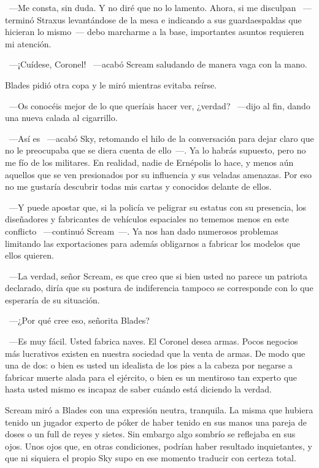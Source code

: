~---Me consta, sin duda. Y no diré que no lo lamento. Ahora, si me disculpan ~---terminó Straxus levantándose de la mesa e indicando a sus guardaespaldas que hicieran lo mismo~--- debo marcharme a la base, importantes asuntos requieren mi atención.

~---¡Cuídese, Coronel! ~---acabó Scream saludando de manera vaga con la mano.

Blades pidió otra copa y le miró mientras evitaba reírse.

~---Os conocéis mejor de lo que queríais hacer ver, ¿verdad? ~---dijo al fin, dando una nueva calada al cigarrillo.

~---Así es ~---acabó Sky, retomando el hilo de la conversación para dejar claro que no le preocupaba que se diera cuenta de ello~---. Ya lo habrás supuesto, pero no me fío de los militares. En realidad, nadie de Ernépolis lo hace, y menos aún aquellos que se ven presionados por su influencia y sus veladas amenazas. Por eso no me gustaría descubrir todas mis cartas y conocidos delante de ellos.

~---Y puede apostar que, si la policía ve peligrar su estatus con su presencia, los diseñadores y fabricantes de vehículos espaciales no tememos menos en este conflicto ~---continuó Scream~---. Ya nos han dado numerosos problemas limitando las exportaciones para además obligarnos a fabricar los modelos que ellos quieren.

~---La verdad, señor Scream, es que creo que si bien usted no parece un patriota declarado, diría que su postura de indiferencia tampoco se corresponde con lo que esperaría de su situación.

~---¿Por qué cree eso, señorita Blades?

~---Es muy fácil. Usted fabrica naves. El Coronel desea armas. Pocos negocios más lucrativos existen en nuestra sociedad que la venta de armas. De modo que una de dos: o bien es usted un idealista de los pies a la cabeza por negarse a fabricar muerte alada para el ejército, o bien es un mentiroso tan experto que hasta usted mismo es incapaz de saber cuándo está diciendo la verdad.

Scream miró a Blades con una expresión neutra, tranquila. La misma que hubiera tenido un jugador experto de póker de haber tenido en sus manos una pareja de doses o un full de reyes y sietes. Sin embargo algo sombrío se reflejaba en sus ojos. Unos ojos que, en otras condiciones, podrían haber resultado inquietantes, y que ni siquiera el propio Sky supo en ese momento traducir con certeza total.

